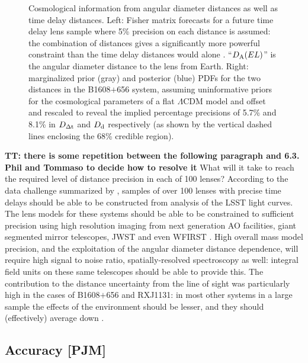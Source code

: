 \begin{figure}[!t]
\begin{minipage}{0.48\linewidth}
\end{minipage}
\caption{Cosmological information from angular diameter distances
as well as time delay distances. Left: Fisher matrix
forecasts for a future time delay lens sample where 5\% precision on
each distance is assumed: the combination of distances gives a
significantly more powerful constraint than the time delay distances
would alone \citep[reproduced from][]{JeeEtal2016}. ``$D_{\rm A}(EL)$'' is
the angular diameter distance to the lens from Earth. Right: marginalized
prior (gray) and posterior (blue) PDFs for the two
distances in the B1608$+$656 system, assuming uninformative priors for the
cosmological parameters of a flat $\Lambda$CDM model and offset and
rescaled to reveal the implied percentage precisions of 5.7\% and 8.1\%
in $D_{\Delta{\rm t}}$ and $D_{\rm d}$ respectively (as shown by the vertical dashed lines
enclosing the 68\% credible region). }
\label{fig:DdDdt}
\end{figure}


{\bf TT: there is some repetition between the following paragraph and 6.3. Phil and Tommaso to decide how to resolve it}
What will it take to reach the required level of distance precision in
each of 100 lenses?  According to the data challenge summarized by
\citet{LiaoEtal2015}, samples of over 100 lenses with
precise time delays should be able to be constructed from analysis of
the LSST light curves. The lens models for these systems should be
able to be constrained to sufficient precision using high resolution
imaging from next generation AO facilities, giant segmented mirror
telescopes, JWST and even WFIRST \citep{Men++15}. High overall mass
model precision, and the exploitation of the angular diameter distance
dependence, will require high signal to noise ratio,
spatially-resolved spectroscopy as well: integral field units on these
same telescopes should be able to provide this. The contribution to
the distance uncertainty from the line of sight was particularly high
in the cases of B1608$+$656 and RXJ1131: in most other systems in a
large sample the effects of the environment should be lesser, and they
should (effectively) average down \citep{ColletEtal2013}. 



\subsection{Accuracy [PJM]}
\label{ssec:accuracy}

